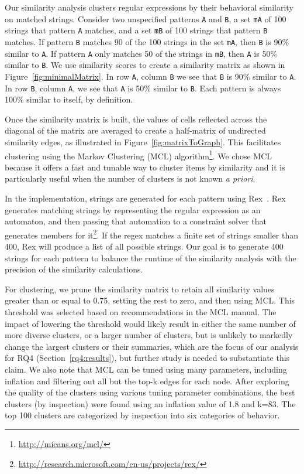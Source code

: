 Our similarity analysis clusters regular expressions by their behavioral similarity on matched strings.
Consider two unspecified patterns {\tt A} and {\tt B}, a set {\tt mA} of 100 strings that pattern {\tt A} matches, and a set {\tt mB} of 100 strings that pattern {\tt B} matches.
If pattern {\tt B} matches 90 of the 100 strings in the set {\tt mA}, then {\tt B} is 90\% similar to {\tt A}.
If pattern {\tt A} only matches 50 of the strings in {\tt mB}, then {\tt A} is 50\% similar to {\tt B}.
We use similarity scores to create a similarity matrix as shown in Figure~\ref{fig:minimalMatrix}.
In row {\tt A}, column {\tt B} we see that {\tt B} is 90\% similar to {\tt A}.
In row {\tt B}, column {\tt A}, we see that {\tt A} is 50\% similar to {\tt B}.  Each pattern is always 100\% similar to itself, by definition.

Once the similarity matrix is built, the values of cells reflected across the diagonal of the matrix are averaged to create a half-matrix of undirected similarity edges, as illustrated in Figure~\ref{fig:matrixToGraph}.
This facilitates clustering using the  Markov Clustering (MCL) algorithm\footnote{\url{http://micans.org/mcl/}}.
We chose MCL  because it offers a fast and tunable way to cluster items by similarity and it is particularly useful when the number of clusters is not known \emph{a priori}.


In the implementation, strings are generated for each pattern using Rex~\cite{rex}.  Rex generates matching strings by representing the regular expression as an automaton, and then passing that automation to a constraint solver that generates members for it\footnote{\url{http://research.microsoft.com/en-us/projects/rex/}}.  If the regex matches a finite set of strings smaller than 400, Rex will produce a list of all possible strings.
Our goal is to generate 400 strings for each pattern to balance the runtime of the similarity analysis with the precision of the similarity calculations.


For clustering, we prune the similarity matrix to retain all similarity values greater than or equal to 0.75, setting the rest to zero, and then using MCL.
This threshold was selected based on recommendations in the MCL manual. The impact of lowering the threshold would likely result  in either the same number of more diverse clusters, or a larger number of clusters, but is unlikely to markedly change the largest clusters or their summaries, which are the focus of our analysis for RQ4 (Section~\ref{rq4:results}), but further study is needed to substantiate this claim.
We also note that MCL can be tuned using many parameters, including inflation and filtering out all but the top-k edges for each node.
After exploring the quality of the clusters using various tuning parameter combinations, the best clusters (by inspection) were found using an inflation value of 1.8 and k=83.   The top 100 clusters are categorized by inspection into six categories of behavior. %

